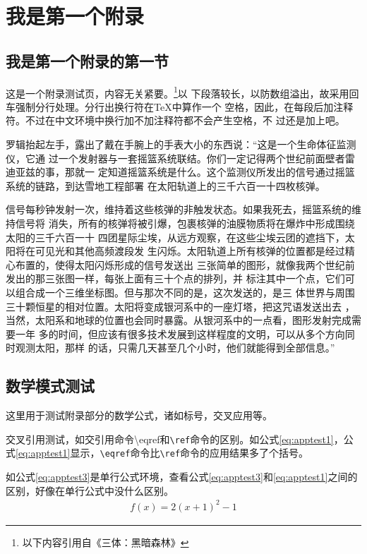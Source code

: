 \chapter{我是第一个附录}
\section{我是第一个附录的第一节}
这是一个附录测试页，内容无关紧要。\footnote{以下内容引用自《三体：黑暗森林》}以%
下段落较长，以防数组溢出，故采用回车强制分行处理。分行出换行符在\TeX 中算作一个%
空格，因此，在每段后加注释符。不过在中文环境中换行加不加注释符都不会产生空格，不%
过还是加上吧。

罗辑抬起左手，露出了戴在手腕上的手表大小的东西说：“这是一个生命体征监测仪，它通%
过一个发射器与一套摇篮系统联结。你们一定记得两个世纪前面壁者雷迪亚兹的事，那就一%
定知道摇篮系统是什么。这个监测仪所发出的信号通过摇篮系统的链路，到达雪地工程部署%
在太阳轨道上的三千六百一十四枚核弹。

信号每秒钟发射一次，维持着这些核弹的非触发状态。如果我死去，摇篮系统的维持信号将%
消失，所有的核弹将被引爆，包裹核弹的油膜物质将在爆炸中形成围绕太阳的三千六百一十%
四团星际尘埃，从远方观察，在这些尘埃云团的遮挡下，太阳将在可见光和其他高频渡段发%
生闪烁。太阳轨道上所有核弹的位置都是经过精心布置的，使得太阳闪烁形成的信号发送出%
三张简单的图形，就像我两个世纪前发出的那三张图一样，每张上面有三十个点的排列，并%
标注其中一个点，它们可以组合成一个三维坐标图。但与那次不同的是，这次发送的，是三%
体世界与周围三十颗恒星的相对位置。太阳将变成银河系中的一座灯塔，把这咒语发送出去%
，当然，太阳系和地球的位置也会同时暴露。从银河系中的一点看，图形发射完成需要一年%
多的时间，但应该有很多技术发展到这样程度的文明，可以从多个方向同时观测太阳，那样%
的话，只需几天甚至几个小时，他们就能得到全部信息。”

\section{数学模式测试}
这里用于测试附录部分的数学公式，诸如标号，交叉应用等。

交叉引用测试，如交引用命令{\ttfamily \textbackslash eqref}和\texttt{\textbackslash ref}命令的区别。如公式\eqref{eq:apptest1}，公式\ref{eq:apptest1}显示，\texttt{\textbackslash eqref}命令比\texttt{\textbackslash ref}命令的应用结果多了个括号。

如公式\eqref{eq:apptest3}是单行公式环境，查看公式\eqref{eq:apptest3}和\eqref{eq:apptest1}之间的区别，好像在单行公式中没什么区别。
\begin{align}\label{eq:apptest3}
	f(x) = 2(x + 1)^{2} - 1
\end{align}

